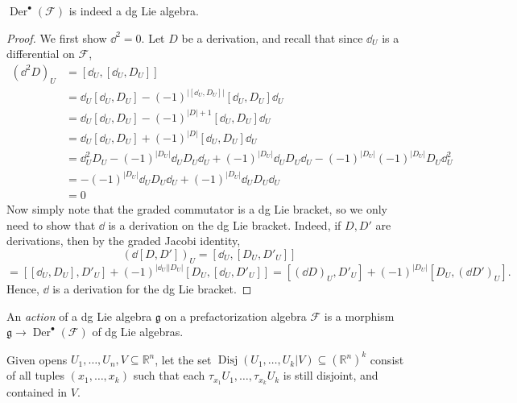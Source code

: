 \begin{claim}
	$\operatorname{Der} ^{\bullet} (\mathcal{F} )$ is indeed a dg Lie algebra.
\end{claim}
\begin{proof}
	We first show $\dd ^2=0$. Let $D$ be a derivation, and recall that since $\dd _U$ is a differential on $\mathcal{F} $, 
	\begin{align*}
		(\dd ^2D)_U &= [\dd _U,[\dd _U,D_U]]\\
			    &= \dd _U[\dd _U,D_U] - (-1)^{\left| [\dd _U, D_U] \right| } [\dd _U,D_U]\dd _U \\
			    &= \dd _U[\dd _U,D_U] - (-1)^{\left| D \right| +1} [\dd _U, D_U]\dd _U\\
			    &=\dd _U[\dd _U,D_U] + (-1)^{\left| D \right| } [\dd _U,D_U]\dd _U\\
			    &=\dd ^2_UD_U - (-1)^{\left| D_U \right| } \dd _UD_U\dd _U + (-1)^{\left| D_U \right| }\dd _UD_U\dd _U - (-1)^{\left| D_U \right| }(-1)^{\left| D_U \right| } D_U\dd ^2_U\\
			    &=-(-1)^{\left| D_U \right| } \dd _UD_U\dd _U + (-1)^{\left| D_U \right| }\dd _UD_U\dd _U\\
			    &=0
	\end{align*}
	Now simply note that the graded commutator is a dg Lie bracket, so we only need to show that $\dd $ is a derivation on the dg Lie bracket. Indeed, if $D,D'$ are derivations, then by the graded Jacobi identity,
	\[
		(\dd [D,D'])_U = [\dd _U, [D_U,D'_U]] 
	\]
	\[
		=[[\dd _U,D_U],D'_U] + (-1)^{\left| \dd _U \right| \left| D_U \right| }[D_U,[\dd _U,D'_U]] = [(\dd D)_U,D'_U] + (-1)^{\left| D_U \right| } [D_U,(\dd D')_U]
	.\]
	Hence, $\dd $ is a derivation for the dg Lie bracket.
\end{proof}


\begin{definition}\label{dfn:action-on-pfa}
	An \emph{action} of a dg Lie algebra $\mathfrak{g} $ on a prefactorization algebra $\mathcal{F} $ is a morphism $\mathfrak{g} \to \operatorname{Der} ^{\bullet} (\mathcal{F} )$ of dg Lie algebras.
\end{definition}


Given opens $U_1, \ldots ,U_n,V \subseteq \mathbb{R} ^n$, let the set $\operatorname{Disj}(U_1, \ldots , U_k | V) \subseteq (\mathbb{R} ^n)^k$ consist of all tuples $(x_1, \ldots , x_k)$ such that each $\tau _{x_1} U_1, \ldots , \tau _{x_k} U_k$ is still disjoint, and contained in $V$.

